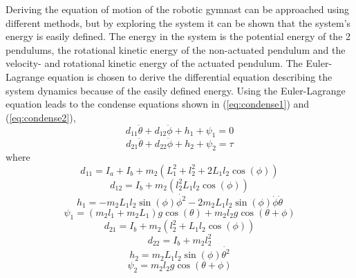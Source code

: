 \documentclass[a4paper,12pt]{article}
\begin{document}
	Deriving the equation of motion of the robotic gymnast can be approached using different methods, but by exploring the system it can be shown that the system's energy is easily defined. The energy in the system is the potential energy of the 2 pendulums, the rotational kinetic energy of the non-actuated pendulum and the velocity- and rotational kinetic energy of the actuated pendulum. The Euler-Lagrange equation is chosen to derive the differential equation describing the system dynamics because of the easily defined energy. Using the Euler-Lagrange equation leads to the condense equations shown in (\ref{eq:condense1}) and (\ref{eq:condense2}),
	\begin{equation} \label{eq:condense1}
		d_{11}\ddot{\theta}+d_{12}\ddot{\phi} + h_{1} + \psi_{1} = 0
	\end{equation}
	\begin{equation} \label{eq:condense2}
			d_{21}\ddot{\theta} + d_{22}\ddot{\phi} + h_{2} + \psi_{2} = \tau
	\end{equation}
	where
		\begin{equation} \label{eq:d11}
	d_{11} = I_{a} + I_{b} + m_{2}(L_{1}^2 + l_{2}^2+2L_{1}l_{2}\cos(\phi))
	\end{equation}
		\begin{equation} \label{eq:d12}
	d_{12} = I_{b} +m_{2}(l_{2}^2 L_{1}l_{2}\cos(\phi))
	\end{equation}
		\begin{equation} \label{eq:h1}
	h_{1} = -m_{2}L_{1}l_{2}\sin(\phi)\dot{\phi^2}-2m_{2}L_{1}l_{2}\sin(\phi)\dot{\phi}\dot{\theta}
	\end{equation}
		\begin{equation} \label{eq:psi1}
	\psi_{1} = (m_{2}l_{1}+m_{2}L_{1})g\cos(\theta) + m_{2}l_{2}g\cos(\theta+\phi)
	\end{equation}
		\begin{equation} \label{eq:d21}
	d_{21}= I_{b}+m_{2}(l_{2}^2+L_{1}l_{2}\cos(\phi))
	\end{equation}
		\begin{equation} \label{eq:d22}
	d_{22}= I_{b}+ m_{2}l_{2}^2
	\end{equation}
		\begin{equation} \label{eq:h2}
	h_{2}= m_{2}L_{1}l_{2}\sin(\phi)\dot{\theta^2}
	\end{equation}
		\begin{equation} \label{eq:psi2}
	\psi_{2}= m_{2}l_{2}g\cos(\theta+\phi)
	\end{equation}
	
\end{document}
